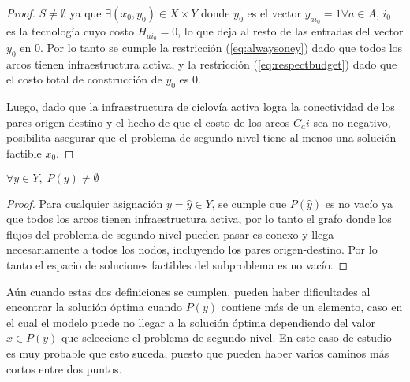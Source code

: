 \begin{proof}
$S \neq \emptyset$ ya que $\exists (x_0, y_0) \in X \times Y$ donde $y_0$ es el vector $y_{ai_0} = 1 \forall a \in A$, $i_0$ es la tecnología cuyo costo $H_{ai_0} = 0$, lo que deja al resto de las entradas del vector $y_0$ en $0$. Por lo tanto se cumple la restricción (\ref{eq:alwaysoney}) dado que todos los arcos tienen infraestructura activa, y la restricción (\ref{eq:respectbudget}) dado que el costo total de construcción de $y_0$ es $0$.

Luego, dado que la infraestructura de ciclovía activa logra la conectividad de los pares origen-destino y el hecho de que el costo de los arcos $C_ai$ sea no negativo, posibilita asegurar que el problema de segundo nivel tiene al menos una solución factible $x_0$.
\end{proof}

\begin{lemma}$\forall y \in Y,\; P(y) \neq \emptyset$
\end{lemma}

\begin{proof}
Para cualquier asignación $y = \hat{y} \in Y$, se cumple que $P(\hat{y})$ es no vacío ya que todos los arcos tienen infraestructura activa, por lo tanto el grafo donde los flujos del problema de segundo nivel pueden pasar es conexo y llega necesariamente a todos los nodos, incluyendo los pares origen-destino. Por lo tanto el espacio de soluciones factibles del subproblema es no vacío. 
\end{proof}

Aún cuando estas dos definiciones se cumplen, pueden haber dificultades al encontrar la solución óptima cuando $P(y)$ contiene más de un elemento, caso en el cual el modelo puede no llegar a la solución óptima dependiendo del valor $x \in P(y)$ que seleccione el problema de segundo nivel. En este caso de estudio es muy probable que esto suceda, puesto que pueden haber varios caminos más cortos entre dos puntos.
